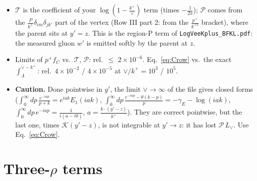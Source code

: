 \documentclass[10pt]{article}
\numberwithin{equation}{section}
\newcommand{\Lv}{L_{\vee}}
\newcommand{\KK}{\mathcal K}
\begin{document}
\begin{itemize}
\item $\mathcal T$ is the coefficient of your $\log(1-\frac{k^+}{\vee})$ term (times $-\frac{1}{2\pi}$); $\mathcal P$ comes from the $\frac{P}{k^+}\delta_{im}\delta_{jk'}$ part of the vertex (Row III part 2: from the $\frac{p^+}{k^{+2}}$ bracket), where the parent sits at $y'=z$. This is the region-P term of \texttt{LogVeeKplus\_BFKL.pdf}: the measured gluon $w'$ is emitted softly by the parent at $z$.
\item Limits of $p^+f_C$ vs.\ $\mathcal T$, $\mathcal P$: rel.\ $\le$ $2\times10^{-6}$. Eq.~\eqref{eq:Crow} vs.\ the exact $\int_\Lambda^{\vee-k^+}$: rel.\ $4\times10^{-2}$ / $4\times10^{-5}$ at $\vee/k^+=10^3$ / $10^5$.
\item \textbf{Caution.} Done pointwise in $y'$, the limit $\vee\to\infty$ of the file gives closed forms ($\int_0^\infty dp\,\frac{e^{-iap}}{p+k}=e^{iak}E_1(iak)$, $\int_0^\infty dp\,\frac{e^{-iap}-\theta(k-p)}{p}=-\gamma_E-\log(iak)$, $\int_0^\infty dp\,e^{-iap}=\frac{1}{i(a-i0)}$, $a=\frac{k\cdot(y'-z)}{k^+}$). They are correct pointwise, but the last one, times $\KK(y'-z)$, is not integrable at $y'\to z$: it has lost $\mathcal P\,\Lv$. Use Eq.~\eqref{eq:Crow}.
\end{itemize}

\section{Three-\texorpdfstring{$\rho$}{rho} terms}\label{sec:three}
\end{document}
